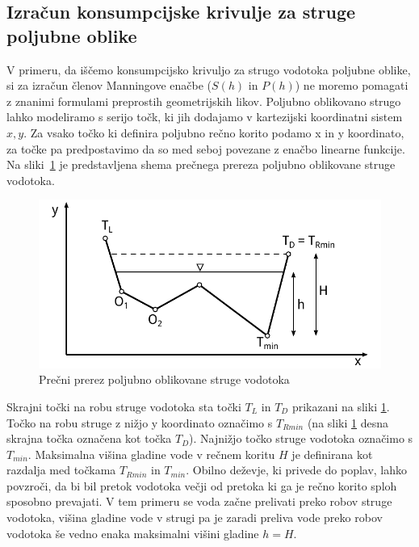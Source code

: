 \subsection{Izračun konsumpcijske krivulje za struge poljubne oblike} \label{sec:teorija_metodaPoljubnaOblika}


V primeru, da iščemo konsumpcijsko krivuljo za strugo vodotoka poljubne oblike, si za izračun členov Manningove enačbe ($S(h)$ in $P(h)$) ne moremo pomagati z znanimi formulami preprostih geometrijskih likov. Poljubno oblikovano strugo lahko modeliramo s serijo točk, ki jih dodajamo v kartezijski koordinatni sistem $x,y$. Za vsako točko ki definira poljubno rečno korito podamo x in y koordinato, za točke pa predpostavimo da so med seboj povezane z enačbo linearne funkcije. Na sliki~\ref{fig:poljubnaStruga} je predstavljena shema prečnega prereza poljubno oblikovane struge vodotoka.

\begin{figure}[ht!]
	\begin{centering}
		\includegraphics{slike/customChannel/customStruga.pdf}\caption{Prečni prerez poljubno oblikovane struge vodotoka}\label{fig:poljubnaStruga}
	\end{centering}
\end{figure}



Skrajni točki na robu struge vodotoka sta točki $T_L$ in $T_D$ prikazani na sliki \ref{fig:poljubnaStruga}. Točko na robu struge z nižjo y koordinato označimo s $T_{Rmin}$ (na sliki \ref{fig:poljubnaStruga} desna skrajna točka označena kot točka $T_D$). Najnižjo točko struge vodotoka označimo s $T_{min}$. Maksimalna višina gladine vode v rečnem koritu $H$ je definirana kot razdalja med točkama $T_{Rmin}$ in $T_{min}$. Obilno deževje, ki privede do poplav, lahko povzroči, da bi bil pretok vodotoka večji od pretoka ki ga je rečno korito sploh sposobno prevajati. V tem primeru se voda začne prelivati preko robov struge vodotoka, višina gladine vode v strugi pa je zaradi preliva vode preko robov vodotoka še vedno enaka maksimalni višini gladine $h=H$.



